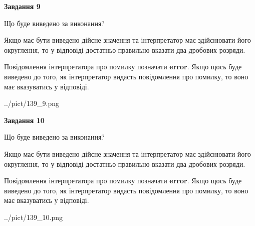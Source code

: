 \documentclass[12pt, ukrainian]{article}
\begin{document}
{\begin {Large}
{\begin {center}\textbf{Завдання 9}\end {center}}\par
Що буде виведено за виконання? \par

Якщо має бути виведено дійсне значення та інтерпретатор має здійснювати його округлення, 
то у відповіді достатньо правильно вказати два дробових розряди.

Повідомлення інтерпретатора про помилку позначати \textbf{error}.
Якщо щось буде виведено до того, як інтерпретатор видасть повідомлення про помилку, 
то воно має вказуватись у відповіді. \par

\begin{center}
	{../pict/139_9.png}
\end{center}
\newpage

{\begin {center}\textbf{Завдання 10}\end {center}}\par
Що буде виведено за виконання? \par

Якщо має бути виведено дійсне значення та інтерпретатор має здійснювати його округлення, 
то у відповіді достатньо правильно вказати два дробових розряди.

Повідомлення інтерпретатора про помилку позначати \textbf{error}.
Якщо щось буде виведено до того, як інтерпретатор видасть повідомлення про помилку, 
то воно має вказуватись у відповіді. \par

\begin{center}
	{../pict/139_10.png}
\end{center}
\newpage

\end {Large}}
\end{document}
